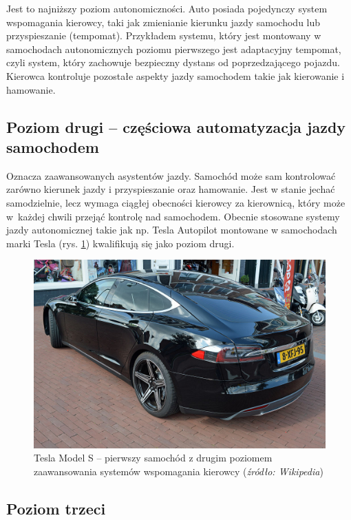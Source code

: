 Jest to najniższy poziom autonomiczności. 
Auto posiada pojedynczy system wspomagania kierowcy, taki jak zmienianie kierunku jazdy samochodu lub przyspieszanie (tempomat). 
Przykładem systemu, który jest montowany w samochodach autonomicznych poziomu pierwszego jest adaptacyjny tempomat, czyli system, który zachowuje bezpieczny dystans od poprzedzającego pojazdu. 
Kierowca kontroluje pozostałe aspekty jazdy samochodem takie jak kierowanie i hamowanie. 


\subsection{Poziom drugi -- częściowa automatyzacja jazdy samochodem}
Oznacza zaawansowanych asystentów jazdy. 
Samochód może sam kontrolować zarówno kierunek jazdy i przyspieszanie oraz hamowanie. 
Jest w stanie jechać samodzielnie, lecz wymaga ciągłej obecności kierowcy za kierownicą, który może w~każdej chwili przejąć kontrolę nad samochodem. 
Obecnie stosowane systemy jazdy autonomicznej takie jak np. Tesla Autopilot montowane w samochodach marki Tesla (rys. \ref{fig:teslas}) kwalifikują się jako poziom drugi.

\begin{figure}
  \centering
  \includegraphics[width=12cm]{img/tesla.jpg}
  \caption{Tesla Model S -- pierwszy samochód z drugim poziomem zaawansowania systemów wspomagania kierowcy (\textit{źródło: Wikipedia})}
  \label{fig:teslas}
\end{figure}

\subsection{Poziom trzeci}

